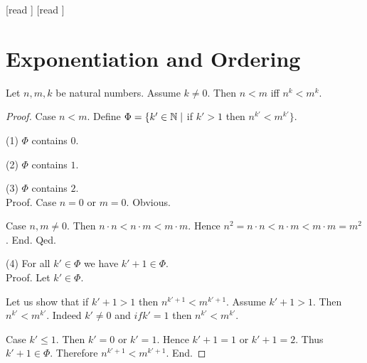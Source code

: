 \documentclass[10pt]{article}
\begin{document}
  \begin{imports}
    \begin{forthel}
      [read ]
      [read ]
    \end{forthel}
  \end{imports}


  \section*{Exponentiation and Ordering}

  \begin{forthel}
    \begin{proposition}[id=ARITHMETIC_09_3373702288769024,printid]
      Let $n, m, k$ be natural numbers.
      Assume $k \neq 0$.
      Then $n < m$ iff $n^{k} < m^{k}$.
    \end{proposition}
    \begin{proof}
      Case $n < m$.
        Define $\Phi = \{ k' \in \mathbb{N} \mid$ if $k' > 1$ then $n^{k'} < m^{k'} \}$.

        (1) $\Phi$ contains $0$.

        (2) $\Phi$ contains $1$.

        (3) $\Phi$ contains $2$. \\
        Proof.
          Case $n = 0$ or $m = 0$. Obvious.

          Case $n, m \neq 0$.
            Then $n \cdot n
              < n \cdot m
              < m \cdot m$.
            Hence $n^{2}
              = n \cdot n
              < n \cdot m
              < m \cdot m
              = m^{2}$.
          End.
        Qed.

        (4) For all $k' \in \Phi$ we have $k' + 1 \in \Phi$. \\
        Proof.
          Let $k' \in \Phi$.

          Let us show that if $k' + 1 > 1$ then $n^{k' + 1} < m^{k' + 1}$.
            Assume $k' + 1 > 1$.
            Then $n^{k'} < m^{k'}$.
            Indeed $k' \neq 0$ and $if k' = 1$ then $n^{k'} < m^{k'}$.

            Case $k' \leq 1$.
              Then $k' = 0$ or $k' = 1$.
              Hence $k' + 1 = 1$ or $k' + 1 = 2$.
              Thus $k' + 1 \in \Phi$.
              Therefore $n^{k' + 1} < m^{k' + 1}$.
            End.


\end{proof}
\end{forthel}
\end{document}
